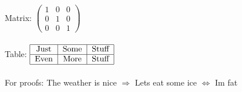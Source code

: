 \documentclass[12pt,pdftex,a4paper]{article}
\begin{document}
Matrix: 
$\begin{pmatrix}
1 & 0 & 0\\
0 & 1 & 0\\
0 & 0 & 1
\end{pmatrix}$\\ \\

Table: 
$\begin{tabular}{|c|c|c|}\hline
   Just & Some & Stuff \\ \hline 
   Even & More & Stuff  \\ \hline
\end{tabular}$\\\\

For proofs: The weather is nice $\Rightarrow$ Lets eat some ice $\Leftrightarrow$ Im fat




\end{document}
